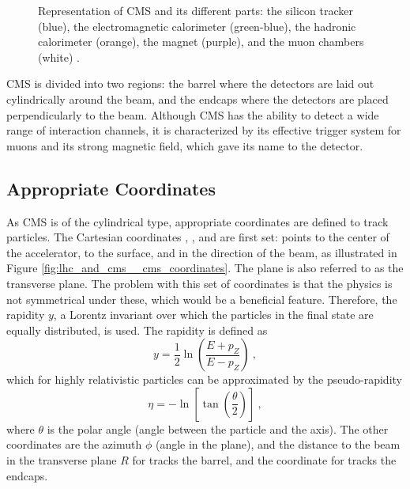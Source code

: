 		\begin{figure}[h!]
			\centering
			\caption{Representation of CMS and its different parts: the silicon tracker (blue), the electromagnetic calorimeter (green-blue), the hadronic calorimeter (orange), the magnet (purple), and the muon chambers (white) \Cite{Fig:cms-detector-design}.}
			\label{fig:lhc_and_cms__cms_global_view}
		\end{figure}

		CMS is divided into two regions: the barrel where the detectors are laid out cylindrically around the beam, and the endcaps where the detectors are placed perpendicularly to the beam. Although CMS has the ability to detect a wide range of interaction channels, it is characterized by its effective trigger system for muons and its strong magnetic field, which gave its name to the detector.

		\subsection{Appropriate Coordinates}
			\label{sec:lhc_and_cms__appropriated_coordinates}

			As CMS is of the cylindrical type, appropriate coordinates are defined to track particles. The Cartesian coordinates , , and  are first set:  points to the center of the accelerator,  to the surface, and  in the direction of the beam, as illustrated in Figure \ref{fig:lhc_and_cms__cms_coordinates}. The  plane is also referred to as the transverse plane. The problem with this set of coordinates is that the physics is not symmetrical under these, which would be a beneficial feature. Therefore, the rapidity $ y $, a Lorentz invariant over which the particles in the final state are equally distributed, is used. The rapidity is defined as
			\begin{equation}
				y = \frac{1}{2} \ln \left( \frac{E + p_Z}{E - p_Z} \right) \ ,
			\end{equation}
			which for highly relativistic particles can be approximated by the pseudo-rapidity
			\begin{equation}
				\eta = - \ln \left[ \tan \left( \frac{\theta}{2} \right) \right] \ ,
			\end{equation}
			where $ \theta $ is the polar angle (angle between the particle and the  axis). The other coordinates are the azimuth $ \phi $ (angle in the  plane), and the distance to the beam in the transverse plane $ R $ for tracks the barrel, and the  coordinate for tracks the endcaps. \\

